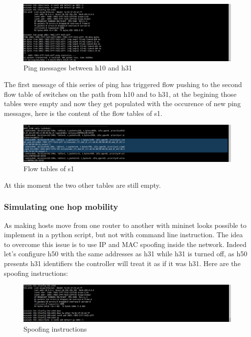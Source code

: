 \documentclass{article}
\begin{document}
\begin{figure}[h!]
  \centering
    \includegraphics[trim = 0mm 0mm 237mm 0mm,clip,scale=0.5]{reportPictures/h10_ping_h31.png}
  \caption{Ping messages between h10 and h31}
\end{figure}


The first message of this series of ping has triggered flow pushing to
the second flow table of switches on the path from h10 and to h31, at
the begining those tables were empty and now they get populated with
the occurence of new ping messages, here is the content of the flow
tables of s1.

\begin{figure}[h!]
  \centering
    \includegraphics[trim = 0mm 0mm 237mm 0mm,clip,scale=0.5]{reportPictures/s10_dumpflows.png}
  \caption{Flow tables of s1}
\end{figure}

At this moment the two other tables are still empty.

\subsubsection{Simulating one hop mobility}

As making hosts move from one router to another with mininet looks
possible to implement in a python script, but not with command line
instruction. The idea to overcome this issue is to use IP and MAC
spoofing inside the network. Indeed let's configure h50 with the same
addresses as h31 while h31 is turned off, as h50 presents h31
identifiers the controller will treat it as if it was h31.
Here are the spoofing instructions: 

\begin{figure}[h!]
  \centering
    \includegraphics[trim = 0mm 0mm 237mm 0mm,clip,scale=0.5]{reportPictures/h50_spoofs_h31.png}
  \caption{Spoofing instructions}
\end{figure}
\end{document}
